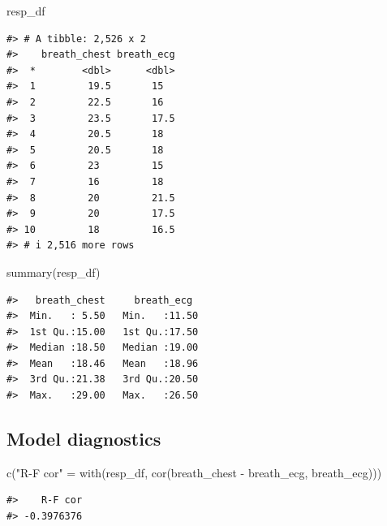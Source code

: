 \documentclass[
]{article}
\newenvironment{Shaded}{\begin{snugshade}}{\end{snugshade}}
\newcommand{\FunctionTok}[1]{\textcolor[rgb]{0.00,0.00,0.00}{#1}}
\newcommand{\NormalTok}[1]{#1}
\newcommand{\OtherTok}[1]{\textcolor[rgb]{0.56,0.35,0.01}{#1}}
\newcommand{\SpecialCharTok}[1]{\textcolor[rgb]{0.00,0.00,0.00}{#1}}
\newcommand{\StringTok}[1]{\textcolor[rgb]{0.31,0.60,0.02}{#1}}
\begin{document}
\begin{Shaded}
\begin{Highlighting}[]
\NormalTok{resp\_df}
\end{Highlighting}
\end{Shaded}

\begin{verbatim}
#> # A tibble: 2,526 x 2
#>    breath_chest breath_ecg
#>  *        <dbl>      <dbl>
#>  1         19.5       15  
#>  2         22.5       16  
#>  3         23.5       17.5
#>  4         20.5       18  
#>  5         20.5       18  
#>  6         23         15  
#>  7         16         18  
#>  8         20         21.5
#>  9         20         17.5
#> 10         18         16.5
#> # i 2,516 more rows
\end{verbatim}

\begin{Shaded}
\begin{Highlighting}[]
\FunctionTok{summary}\NormalTok{(resp\_df)}
\end{Highlighting}
\end{Shaded}

\begin{verbatim}
#>   breath_chest     breath_ecg   
#>  Min.   : 5.50   Min.   :11.50  
#>  1st Qu.:15.00   1st Qu.:17.50  
#>  Median :18.50   Median :19.00  
#>  Mean   :18.46   Mean   :18.96  
#>  3rd Qu.:21.38   3rd Qu.:20.50  
#>  Max.   :29.00   Max.   :26.50
\end{verbatim}

\hypertarget{model-diagnostics-1}{%
\subsection{Model diagnostics}\label{model-diagnostics-1}}

\begin{Shaded}
\begin{Highlighting}[]
\FunctionTok{c}\NormalTok{(}\StringTok{"R{-}F cor"} \OtherTok{=} \FunctionTok{with}\NormalTok{(resp\_df, }\FunctionTok{cor}\NormalTok{(breath\_chest }\SpecialCharTok{{-}}\NormalTok{ breath\_ecg, breath\_ecg)))}
\end{Highlighting}
\end{Shaded}

\begin{verbatim}
#>    R-F cor 
#> -0.3976376
\end{verbatim}
\end{document}

